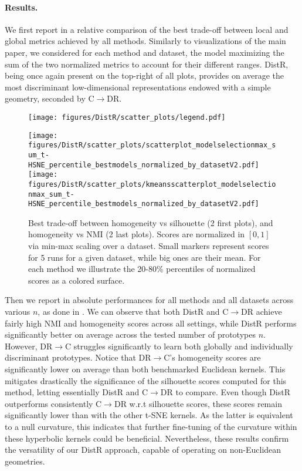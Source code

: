 \paragraph{Results.} We first report in  a relative comparison of the best trade-off between local and global metrics achieved by all methods. Similarly to visualizations of the main paper, we considered for each method and dataset, the model maximizing the sum of the two normalized metrics to account for their different ranges. DistR, being once again present on the top-right of all plots, provides on average the most discriminant
low-dimensional representations endowed with a simple geometry, seconded by
C$\rightarrow$DR. 

\begin{figure*}[h!]
	\begin{center}
		\centerline{\texttt{[image: figures/DistR/scatter\_plots/legend.pdf]}}\vspace{-1mm}
		\centerline{
			\texttt{[image: figures/DistR/scatter\_plots/scatterplot\_modelselectionmax\_sum\_t-HSNE\_percentile\_bestmodels\_normalized\_by\_datasetV2.pdf]}
			\texttt{[image: figures/DistR/scatter\_plots/kmeansscatterplot\_modelselectionmax\_sum\_t-HSNE\_percentile\_bestmodels\_normalized\_by\_datasetV2.pdf]}
		}
		\caption{Best trade-off between homogeneity vs silhouette (2 first plots), and homogeneity vs NMI (2 last plots). Scores are normalized in $\left[0, 1\right]$ via min-max scaling over a dataset. Small markers represent scores for 5 runs for a given dataset, while big ones are their mean. For each method we illustrate the 20-80\% percentiles of normalized scores as a colored surface.
		}
		\vspace{-0.5cm}
		\label{fig:trade_off_hyp}
	\end{center}
	\vspace{-0.3cm}
\end{figure*}

Then we report in  absolute performances for all methods and all datasets across various $n$, as done in . We can observe that both DistR and C$\rightarrow$DR achieve fairly high NMI and homogeneity scores across all settings, while DistR performs significantly better on average across the tested number of prototypes $n$.  However, DR$\rightarrow$C struggles significantly to learn both globally and individually discriminant prototypes. Notice that DR$\rightarrow$C's homogeneity scores are significantly lower on average than both benchmarked Euclidean kernels. This mitigates drastically the significance of the silhouette scores computed for this method, letting essentially DistR and C$\rightarrow$DR to compare. Even though DistR outperforms consistently C$\rightarrow$DR w.r.t silhouette scores, these scores remain significantly lower than with the other t-SNE kernels. As the latter is equivalent to a null curvature, this indicates that further fine-tuning of the curvature within these hyperbolic kernels could be beneficial. Nevertheless, these results confirm the versatility of our DistR approach, capable of operating on non-Euclidean geometries.

